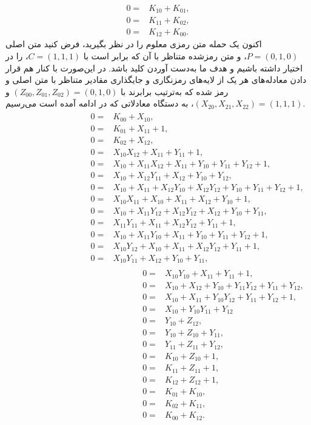 {\small \begin{align*}
	0 =& K_{10} + K_{01},\\
	0 =& K_{11} + K_{02},\\
	0 =& K_{12} + K_{00}.
\end{align*}}
اکنون یک حمله متن رمزی معلوم را در نظر بگیرید، فرض کنید  متن اصلی  
$P = (0, 1, 0)$، 
و متن رمزشده متناظر با آن که برابر است با 
$C = (1, 1, 1)$، 
را در اختیار داشته باشیم و هدف ما به‌دست آوردن کلید باشد.  در این‌صورت با کنار هم قرار دادن معادله‌های هر یک از لایه‌های رمزنگاری و جایگذاری مقادیر متناظر با متن اصلی و رمز شده که به‌ترتیب برابرند با
$(Z_{00},Z_{01},Z_{02}) = (0,1,0)$
و
$(X_{20},X_{21},X_{22}) = (1,1,1)$، 
به دستگاه معادلاتی که در ادامه آمده است می‌رسیم. 
{\small \begin{align*}
\begin{split}
0 =& K_{00} + X_{10},\\
0 =& K_{01} + X_{11} + 1,\\ 
0 =& K_{02} + X_{12},\\
0 =& X_{10} X_{12} + X_{11} + Y_{11} + 1, \\
0 =& X_{10} + X_{11} X_{12} + X_{11} + Y_{10} + Y_{11} + Y_{12} + 1, \\
0 =& X_{10} + X_{12} Y_{11} + X_{12} + Y_{10} + Y_{12},\\
0 =& X_{10} + X_{11} + X_{12} Y_{10} + X_{12} Y_{12} + Y_{10} + Y_{11} + Y_{12} + 1,\\
0 =& X_{10} X_{11} + X_{10} + X_{11} + X_{12} + Y_{10} + 1,\\
0 =& X_{10} + X_{11} Y_{12} + X_{12} Y_{12} + X_{12} + Y_{10} + Y_{11},\\
0 =& X_{11} Y_{11} + X_{11} + X_{12} Y_{12} + Y_{11} + 1,\\
0 =& X_{10} + X_{11} Y_{10} + X_{11} + Y_{10} + Y_{11} + Y_{12} + 1,\\ 
0 =& X_{10} Y_{12} + X_{10} + X_{11} + X_{12} Y_{12} + Y_{11} + 1,\\
0 =& X_{10} Y_{11} + X_{12} + Y_{10} + Y_{11},\\
\end{split}
\begin{split}
0 =& X_{10} Y_{10} + X_{11} + Y_{11} + 1,\\
0 =& X_{10} + X_{12} + Y_{10} + Y_{11} Y_{12} + Y_{11} + Y_{12},\\
0 =& X_{10} + X_{11} + Y_{10} Y_{12} + Y_{11} + Y_{12} + 1,\\
0 =& X_{10} + Y_{10} Y_{11} + Y_{12}\\
0 =& Y_{10} + Z_{12},\\
0 =& Y_{10} + Z_{10} + Y_{11},\\
0 =& Y_{11} + Z_{11} + Y_{12},\\
0 =& K_{10} + Z_{10} + 1,\\
0 =& K_{11} + Z_{11} + 1,\\
0 =& K_{12} + Z_{12} + 1,\\
0 =& K_{01} + K_{10},\\
0 =& K_{02} +K_{11},\\
0 =& K_{00} + K_{12}.
\end{split}
\end{align*}
}

